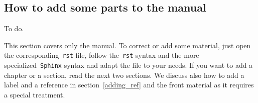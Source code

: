 \documentclass[a4paper,10pt]{article}
\newcommand{\code}[1]{\texttt{#1}}
\begin{document}
%
%
%
%
%
%

\subsection{How to add some parts to the manual}
\label{write_documentation}

To do.

This section covers only the manual. To correct or add some material, just open the corresponding~\code{rst} file, follow the~\code{rst} syntax and the more specialized~\code{Sphinx} syntax and adapt the file to your needs. If you want to add a chapter or a section, read the next two sections. We discuss also how to add a label and a reference in section~\ref{adding_ref} and the front material as it requires a special treatment.
\end{document}

